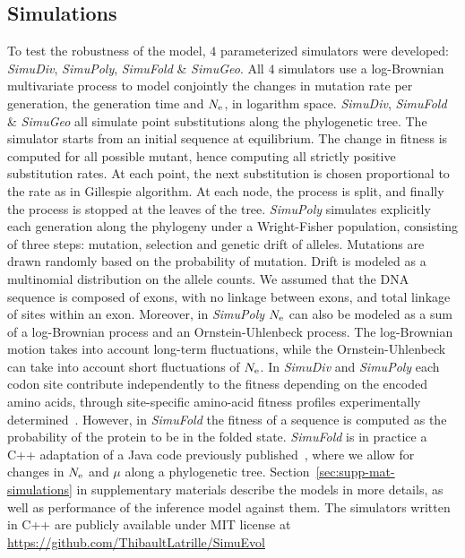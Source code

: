 \subsection{Simulations}
\label{sec:Simulation}
To test the robustness of the model, $4$ parameterized simulators were developed: \textit{SimuDiv}, \textit{SimuPoly}, \textit{SimuFold} \& \textit{SimuGeo}.
All $4$ simulators use a log-Brownian multivariate process to model conjointly the changes in mutation rate per generation, the generation time and $N_{\mathrm{e}}$, in logarithm space.
\textit{SimuDiv}, \textit{SimuFold} \& \textit{SimuGeo} all simulate point \glspl{substitution} along the phylogenetic tree.
The simulator starts from an initial sequence at equilibrium.
The change in fitness is computed for all possible mutant, hence computing all strictly positive \gls{substitution} rates.
At each point, the next \gls{substitution} is chosen proportional to the rate as in Gillespie algorithm.
At each node, the process is split, and finally the process is stopped at the leaves of the tree.
\textit{SimuPoly} simulates explicitly each generation along the phylogeny under a Wright-Fisher population, consisting of three steps: mutation, selection and genetic drift of \glspl{allele}.
Mutations are drawn randomly based on the probability of mutation.
Drift is modeled as a multinomial distribution on the \gls{allele} counts.
We assumed that the \acrshort{DNA} sequence is composed of exons, with no linkage between exons, and total linkage of sites within an exon.
Moreover, in \textit{SimuPoly} $N_{\mathrm{e}}$ can also be modeled as a sum of a log-Brownian process and an Ornstein-Uhlenbeck process.
The log-Brownian motion takes into account long-term fluctuations, while the Ornstein-Uhlenbeck can take into account short fluctuations of $N_{\mathrm{e}}$.
In \textit{SimuDiv} and \textit{SimuPoly} each \gls{codon} site contribute independently to the fitness depending on the encoded amino acids, through site-specific amino-acid fitness profiles experimentally determined~\citep{Bloom2017}.
However, in \textit{SimuFold} the fitness of a sequence is computed as the probability of the protein to be in the folded state.
\textit{SimuFold} is in practice a C++ adaptation of a Java code previously published~\citep{Goldstein2016, Goldstein2017}, where we allow for changes in $N_{\mathrm{e}}$ and $\mu$ along a phylogenetic tree.
Section~\ref{sec:supp-mat-simulations} in supplementary materials describe the models in more details, as well as performance of the inference model against them.
The simulators written in C++ are publicly available under MIT license at \url{https://github.com/ThibaultLatrille/SimuEvol}
